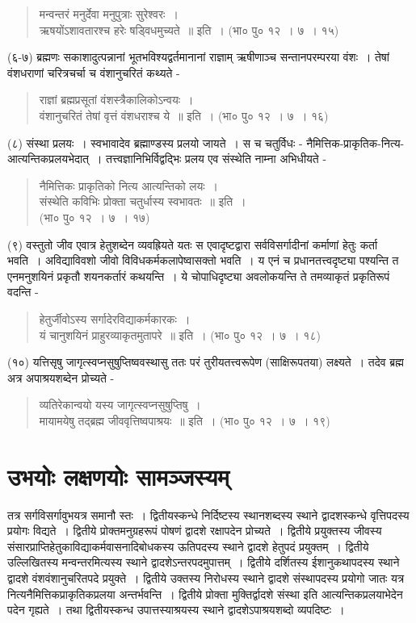 {\begin{verse}
मन्वन्तरं मनुर्देवा मनुपुत्राः सुरेश्वरः~। \\
ऋषयोंऽशावतारश्च हरेः षड्विधमुच्यते~॥ इति~। (भा० पु० १२~। ७~। १५)
\end{verse}
(६-७) ब्रह्मणः सकाशादुत्पन्नानां भूतभविश्यद्वर्तमानानां राज्ञाम् ऋषीणाञ्च सन्तानपरम्परया वंशः~। तेषां वंशधराणां चरित्रचर्चा च वंशानुचरितं कथ्यते -
\begin{verse}
राज्ञां ब्रह्मप्रसूतां वंशस्त्रैकालिकोऽन्वयः~। \\
वंशानुचरितं तेषां वृत्तं वंशधराश्च ये~॥ इति~। (भा० पु० १२~। ७~। १६)
\end{verse}
(८) संस्था प्रलयः~। स्वभावादेव ब्रह्माण्डस्य प्रलयो जायते~। स च चतुर्विधः - नैमित्तिक-प्राकृतिक-नित्य-आत्यन्तिकप्रलयभेदात्~। तत्त्वज्ञानिभिर्विद्वद्भिः प्रलय एव संस्थेति नाम्ना अभिधीयते -
\begin{verse}
नैमित्तिकः प्राकृतिको नित्य आत्यन्तिको लयः~। \\
संस्थेति कविभिः प्रोक्ता चतुर्धास्य स्वभावतः~॥ इति~।\\
\hspace{5cm}(भा० पु० १२~। ७~। १७)
\end{verse}
(९) वस्तुतो जीव एवात्र हेतुशब्देन व्यवह्रियते यतः स एवादृष्टद्वारा सर्वविसर्गादीनां कर्माणां हेतुः कर्ता भवति~। अविद्याविवशो जीवो विविधकर्मकलापेष्वासक्तो भवति~। य एनं च प्रधानतत्त्वदृष्ट्या पश्यन्ति त एनमनुशयिनं प्रकृतौ शयनकर्तारं कथयन्ति~। ये चोपाधिदृष्ट्या अवलोकयन्ति ते तमव्याकृतं प्रकृतिरूपं वदन्ति -
\begin{verse}
हेतुर्जीवोऽस्य सर्गादेरविद्याकर्मकारकः~। \\
यं चानुशयिनं प्राहुरव्याकृतमुतापरे~॥ इति~। (भा० पु० १२~। ७~। १८)
\end{verse}
(१०) यत्तिसृषु जागृत्स्वप्नसुषुप्तिष्ववस्थासु ततः परं तुरीयतत्त्वरूपेण (साक्षिरूपतया) लक्ष्यते~। तदेव ब्रह्म अत्र अपाश्रयशब्देन प्रोच्यते -
\begin{verse}
व्यतिरेकान्वयो यस्य जागृत्स्वप्नसुषुप्तिषु~। \\
मायामयेषु तद्ब्रह्म जीववृत्तिष्वपाश्रयः~॥ इति~। (भा० पु० १२~। ७~। १९)
\end{verse}

\section*{उभयोः लक्षणयोः सामञ्जस्यम्}

तत्र सर्गविसर्गावुभयत्र समानौ स्तः~। द्वितीयस्कन्धे निर्दिष्टस्य स्थानशब्दस्य स्थाने द्वादशस्कन्धे वृत्तिपदस्य प्रयोगः विद्यते~। द्वितीये प्रोक्तमनुग्रहरूपं पोषणं द्वादशे रक्षापदेन प्रोच्यते~। द्वितीये प्रयुक्तस्य जीवस्य संसारप्राप्तिहेतुकाविद्याकर्मवासनादिबोधकस्य ऊतिपदस्य स्थाने द्वादशे हेतुपदं प्रयुक्तम्~। द्वितीये उल्लिखितस्य मन्वन्तरमित्यस्य स्थाने द्वादशेऽन्तरपदमुपात्तम्~। द्वितीये दर्शितस्य ईशानुकथापदस्य स्थाने द्वादशे वंशवंशानुचरितपदे प्रयुक्ते~। द्वितीये उक्तस्य निरोधस्य स्थाने द्वादशे संस्थापदस्य प्रयोगो जातः यत्र नित्यनैमित्तिकप्राकृतिकप्रलया अन्तर्भवन्ति~। द्वितीये प्रोक्ता मुक्तिर्द्वादशे संस्था इति आत्यन्तिकप्रलयाभेदेन पदेन गृह्यते~। तथा द्वितीयस्कन्ध उपात्तस्याश्रयस्य स्थाने द्वादशेऽपाश्रयशब्दो व्यपदिष्टः~। 

}
